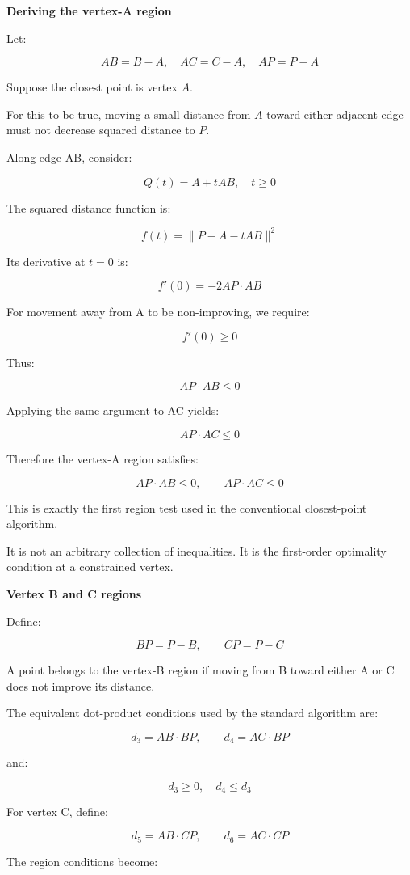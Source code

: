 \textbf{Deriving the vertex-A region}

Let:

\[
AB=B-A,\quad AC=C-A,\quad AP=P-A
\]

Suppose the closest point is vertex \(A\).

For this to be true, moving a small distance from \(A\) toward either adjacent edge must not decrease squared distance to \(P\).

Along edge AB, consider:

\[
Q(t)=A+tAB,\quad t\ge0
\]

The squared distance function is:

\[
f(t)=\|P-A-tAB\|^2
\]

Its derivative at \(t=0\) is:

\[
f'(0)=-2AP\cdot AB
\]

For movement away from A to be non-improving, we require:

\[
f'(0)\ge0
\]

Thus:

\[
AP\cdot AB\le0
\]

Applying the same argument to AC yields:

\[
AP\cdot AC\le0
\]

Therefore the vertex-A region satisfies:

\[
\boxed{ AP\cdot AB\le0,\qquad AP\cdot AC\le0 }
\]

This is exactly the first region test used in the conventional closest-point algorithm.

It is not an arbitrary collection of inequalities. It is the first-order optimality condition at a constrained vertex.

\textbf{Vertex B and C regions}

Define:

\[
BP=P-B,\qquad CP=P-C
\]

A point belongs to the vertex-B region if moving from B toward either A or C does not improve its distance.

The equivalent dot-product conditions used by the standard algorithm are:

\[
d_3=AB\cdot BP,\qquad d_4=AC\cdot BP
\]

and:

\[
\boxed{d_3\ge0,\quad d_4\le d_3}
\]

For vertex C, define:

\[
d_5=AB\cdot CP,\qquad d_6=AC\cdot CP
\]

The region conditions become:

